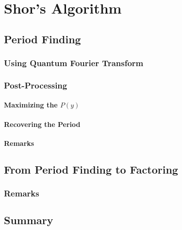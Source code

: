 	\section{Shor's Algorithm} %

		\subsection{Period Finding} %

			\subsubsection{Using Quantum Fourier Transform} %

			\subsubsection{Post-Processing} %

				\paragraph{Maximizing the \(P(y)\)} %

				\paragraph{Recovering the Period} %

				\paragraph{Remarks} %

		\subsection{From Period Finding to Factoring} %

			\subsubsection{Remarks} %

		\subsection{Summary} %

